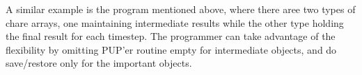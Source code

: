 A similar example is the program mentioned above, where there aree two 
types of chare arrays, one maintaining intermediate results while the 
other type holding the final result for each timestep. The programmer 
can take advantage of the flexibility by omitting PUP'er routine empty
for intermediate objects, and do save/restore only for the important 
objects. 


